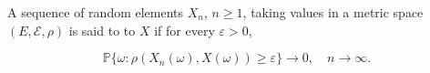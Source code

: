 A sequence of random elements $X_n$, $n \geq 1$, taking values in a metric space $(E, \mathcal{E}, \rho)$ is said to  to $X$ if for every $\varepsilon > 0$,

$$\mathbb{P}\{\omega : \rho(X_n(\omega), X(\omega)) \geq \varepsilon\} \to 0, \quad n \to \infty.$$